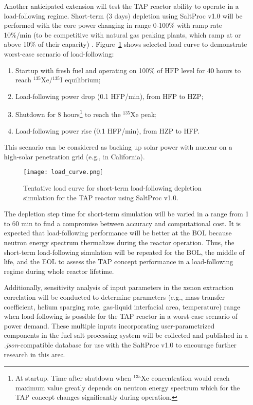 Another anticipated extension will test the \gls{TAP} reactor ability to 
operate in a load-following regime. Short-term (3 days) depletion using 
SaltProc v1.0 will be performed with the core power changing in range 0-100\% 
with ramp rate 10\%/min (to be competitive with natural gas peaking plants, 
which ramp at or above 10\% of their capacity) \cite{huff_enabling_2018}. 
Figure~\ref{fig:load} shows selected load curve to demonstrate worst-case 
scenario of load-following:
\begin{enumerate}
	\item Startup with fresh fuel and operating on 100\% of \gls{HFP}
level 
	for 40 hours to reach $^{135}$Xe/$^{135}$I equilibrium;
	\item Load-following power drop (0.1 \gls{HFP}/min), from \gls{HFP} 
	to \gls{HZP};
	\item Shutdown for 8 hours\footnote{At startup. Time after shutdown when 
	$^{135}$Xe concentration would reach maximum value greatly depends on 
	neutron energy spectrum which for the \gls{TAP} concept changes 
	significantly during operation.} to reach the $^{135}$Xe peak;
	\item Load-following power rise (0.1 \gls{HFP}/min), from \gls{HZP} 
	to \gls{HFP}.
\end{enumerate}
This scenario can be considered as backing up solar power with
nuclear on a 
high-solar penetration grid (e.g., in California).
\begin{figure}[bth!] %
	\centering
	\texttt{[image: load\_curve.png]}
	\caption{Tentative load curve for short-term load-following depletion 
	simulation for the \gls{TAP} reactor using SaltProc v1.0.}
	\label{fig:load}
\end{figure}

The depletion step time for short-term simulation will be varied in a range 
from 1 to 60 min to find a compromise between accuracy and computational cost. 
It is expected that load-following performance will be better at the \gls{BOL} 
because neutron energy spectrum thermalizes during the reactor operation. 
Thus, the short-term load-following simulation will be repeated for the 
\gls{BOL}, the middle of life, and the \gls{EOL} to assess the \gls{TAP} 
concept performance in a load-following regime during whole reactor lifetime.

Additionally, sensitivity analysis of input parameters in the xenon extraction 
correlation will be conducted to determine parameters (e.g., mass transfer 
coefficient, helium sparging rate, gas-liquid interfacial area, temperature) 
range when load-following is possible for the \gls{TAP} 
reactor in a worst-case scenario of power demand. These multiple inputs 
incorporating user-parametrized components in the fuel salt processing 
system will be collected and published in a \textit{.json}-compatible database 
for use with the SaltProc v1.0 to encourage further research in this area.

